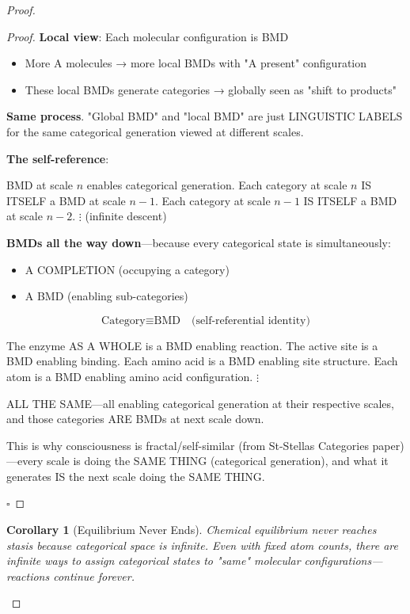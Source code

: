 \documentclass[11pt,a4paper]{article}
\newtheorem{corollary}[theorem]{Corollary}
\begin{document}
\begin{proof}
\begin{proof}
\textbf{Local view}: Each molecular configuration is BMD
\begin{itemize}
\item More A molecules → more local BMDs with "A present" configuration
\item These local BMDs generate categories → globally seen as "shift to products"
\end{itemize}

\textbf{Same process}. "Global BMD" and "local BMD" are just LINGUISTIC LABELS for the same categorical generation viewed at different scales.

\textbf{The self-reference}:

BMD at scale $n$ enables categorical generation.
Each category at scale $n$ IS ITSELF a BMD at scale $n-1$.
Each category at scale $n-1$ IS ITSELF a BMD at scale $n-2$.
$\vdots$ (infinite descent)

\textbf{BMDs all the way down}—because every categorical state is simultaneously:
\begin{itemize}
\item A COMPLETION (occupying a category)
\item A BMD (enabling sub-categories)
\end{itemize}

\begin{equation}
\text{Category} \equiv \text{BMD} \quad \text{(self-referential identity)}
\end{equation}

The enzyme AS A WHOLE is a BMD enabling reaction.
The active site is a BMD enabling binding.
Each amino acid is a BMD enabling site structure.
Each atom is a BMD enabling amino acid configuration.
$\vdots$

ALL THE SAME—all enabling categorical generation at their respective scales, and those categories ARE BMDs at next scale down.

This is why consciousness is fractal/self-similar (from St-Stellas Categories paper)—every scale is doing the SAME THING (categorical generation), and what it generates IS the next scale doing the SAME THING.

$\square$
\end{proof}

\begin{corollary}[Equilibrium Never Ends]
\label{cor:infinite_equilibrium}
Chemical equilibrium never reaches stasis because categorical space is infinite. Even with fixed atom counts, there are infinite ways to assign categorical states to "same" molecular configurations—reactions continue forever.
\end{corollary}


\end{proof}
\end{document}
